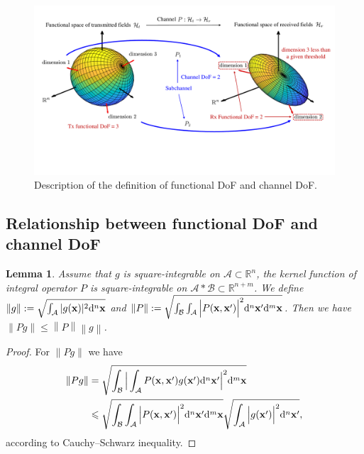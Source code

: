 \documentclass[12pt,draftclsnofoot,journal,onecolumn]{IEEEtran}
\newtheorem{lemma}{Lemma}
\begin{document}
				\begin{figure}
		\centering 
		\includegraphics[width=1\textwidth]{figs/FDoFandCDoF.pdf} 
		\caption{Description of the definition of functional DoF and channel DoF.} 
		\label{FDoFandCDoF}
	\end{figure}

\subsection{\color{red}Relationship between functional DoF and channel DoF}

\label{sec:Relationship_theorem}
	
	\begin{lemma}
		\label{lemma_CS_inequality}
		Assume that $g$ is square-integrable on $\mathcal{A} \subset \mathbb{R}^n$, the kernel function of integral operator $P$ is square-integrable on $\mathcal{A}*\mathcal{B} \subset \mathbb{R}^{n+m}$.
		We define $\left\|  g \right\|:=\sqrt{\int_{\mathcal{A}}|g({\bf x})|^2{\rm d}^n{\bf x}}$ and $\left\| P \right\|:=\sqrt{\int_{\mathcal{B}} \int_{\mathcal{A}}\Big|P({\bf x},{\bf x}')\Big|^2 {\rm d}^n{\bf x}' {\rm d}^m{\bf x} }$. Then we have $\left\| Pg  \right\| \leqslant \left\| P  \right\|\left\| g  \right\| $.
	\end{lemma}
	\begin{proof}
		For $\left\| Pg  \right\|$ we have
		\begin{equation}
			\begin{aligned}
				\left\|  Pg \right\| &= \sqrt{\int_{\mathcal{B}} \Big|\int_{\mathcal{A}}P({\bf x},{\bf x}')g({\bf x}'){\rm d}^n{\bf x}'\Big|^2{\rm d}^m{\bf x}}
				\\&\leqslant \sqrt{\int_{\mathcal{B}} \int_{\mathcal{A}}\Big|P({\bf x},{\bf x}')\Big|^2 {\rm d}^n{\bf x}' {\rm d}^m{\bf x} }
				\sqrt{\int_{\mathcal{A}}\Big|g({\bf x}')\Big|^2{\rm d}^n{\bf x}'},
			\end{aligned}
		\end{equation}
		according to Cauchy–Schwarz inequality.
	\end{proof}
	
\end{document}
